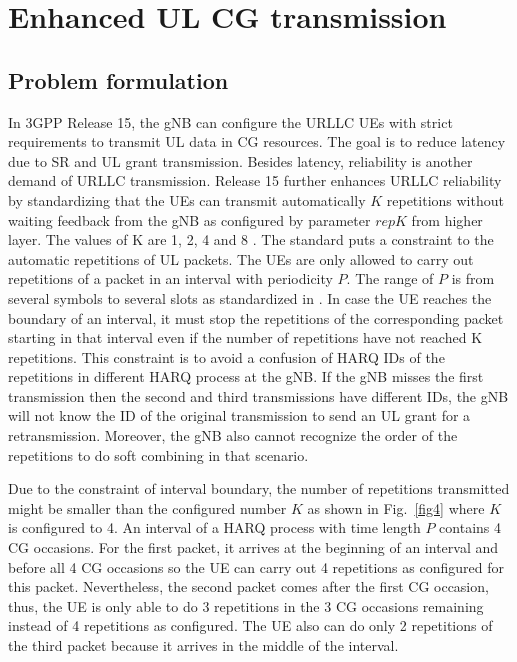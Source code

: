 \documentclass{ieeeaccess}
\begin{document}
\section{Enhanced UL CG transmission}\label{III}
\subsection{Problem formulation}

In 3GPP Release 15, the gNB can configure the URLLC UEs with strict requirements to transmit UL data in CG resources. The goal is to reduce latency due to SR and UL grant transmission. Besides latency, reliability is another demand of URLLC transmission. Release 15 further enhances URLLC reliability by standardizing that the UEs can transmit automatically $K$ repetitions without waiting feedback from the gNB as configured by parameter $repK$ from higher layer. The values of K are 1, 2, 4 and 8 \cite{ref6}.
The standard puts a constraint to the automatic repetitions of UL packets. The UEs are only allowed to carry out repetitions of a packet in an interval with periodicity $P$. The range of $P$ is from several symbols to several slots as standardized in \cite{ref6}. In case the UE reaches the boundary of an interval, it must stop the repetitions of the corresponding packet starting in that interval even if the number of repetitions have not reached K repetitions. This constraint is to avoid a confusion of HARQ IDs of the repetitions in different HARQ process at the gNB. If the gNB misses the first transmission then the second and third transmissions have different IDs, the gNB will not know the ID of the original transmission to send an UL grant for a retransmission. Moreover, the gNB also cannot recognize the order of the repetitions to do soft combining in that scenario. 

Due to the constraint of interval boundary, the number of repetitions transmitted might be smaller than the configured number $K$ as shown in Fig.~\ref{fig4} where $K$ is configured to 4. An interval of a HARQ process with time length $P$ contains 4 CG occasions. For the first packet, it arrives at the beginning of an interval and before all 4 CG occasions so the UE can carry out 4 repetitions as configured for this packet. Nevertheless, the second packet comes after the first CG occasion, thus, the UE is only able to do 3 repetitions in the 3 CG occasions remaining instead of 4 repetitions as configured. The UE also can do only 2 repetitions of the third packet because it arrives in the middle of the interval. 
\end{document}
